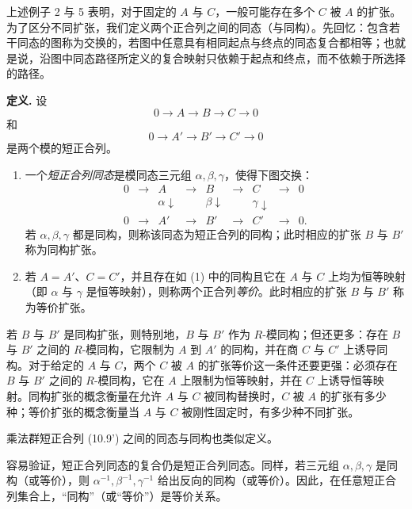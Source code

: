 上述例子 2 与 5 表明，对于固定的 $A$ 与 $C$，一般可能存在多个 $C$ 被 $A$ 的扩张。为了区分不同扩张，我们定义两个正合列之间的同态（与同构）。先回忆：包含若干同态的图称为交换的，若图中任意具有相同起点与终点的同态复合都相等；也就是说，沿图中同态路径所定义的复合映射只依赖于起点和终点，而不依赖于所选择的路径。

\noindent\textbf{定义.} 设
\[
0\longrightarrow A\longrightarrow B\longrightarrow C\longrightarrow0
\]
和
\[
0\longrightarrow A'\longrightarrow B'\longrightarrow C'\longrightarrow0
\]
是两个模的短正合列。
\begin{enumerate}[label=(\arabic*)]
\item 一个\emph{短正合列同态}是模同态三元组 $\alpha,\beta,\gamma$，使得下图交换：
\[
\begin{array}{ccccccccc}
0&\longrightarrow&A&\longrightarrow&B&\longrightarrow&C&\longrightarrow&0\\
 &&\alpha\downarrow&&\beta\downarrow&&\gamma\downarrow&&\\
0&\longrightarrow&A'&\longrightarrow&B'&\longrightarrow&C'&\longrightarrow&0.
\end{array}
\]
若 $\alpha,\beta,\gamma$ 都是同构，则称该同态为短正合列的同构；此时相应的扩张 $B$ 与 $B'$ 称为同构扩张。

\item 若 $A=A'$、$C=C'$，并且存在如 (1) 中的同构且它在 $A$ 与 $C$ 上均为恒等映射（即 $\alpha$ 与 $\gamma$ 是恒等映射），则称两个正合列\emph{等价}。此时相应的扩张 $B$ 与 $B'$ 称为等价扩张。
\end{enumerate}

若 $B$ 与 $B'$ 是同构扩张，则特别地，$B$ 与 $B'$ 作为 $R$-模同构；但还更多：存在 $B$ 与 $B'$ 之间的 $R$-模同构，它限制为 $A$ 到 $A'$ 的同构，并在商 $C$ 与 $C'$ 上诱导同构。对于给定的 $A$ 与 $C$，两个 $C$ 被 $A$ 的扩张等价这一条件还要更强：必须存在 $B$ 与 $B'$ 之间的 $R$-模同构，它在 $A$ 上限制为恒等映射，并在 $C$ 上诱导恒等映射。同构扩张的概念衡量在允许 $A$ 与 $C$ 被同构替换时，$C$ 被 $A$ 的扩张有多少种；等价扩张的概念衡量当 $A$ 与 $C$ 被刚性固定时，有多少种不同扩张。

乘法群短正合列 (10.9') 之间的同态与同构也类似定义。

容易验证，短正合列同态的复合仍是短正合列同态。同样，若三元组 $\alpha,\beta,\gamma$ 是同构（或等价），则 $\alpha^{-1},\beta^{-1},\gamma^{-1}$ 给出反向的同构（或等价）。因此，在任意短正合列集合上，“同构”（或“等价”）是等价关系。

